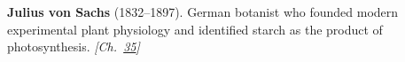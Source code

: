 \textbf{Julius von Sachs} (1832–1897). German botanist who founded modern experimental plant physiology and identified starch as the product of photosynthesis. \emph{[Ch.~\hyperref[ch:treesfromair]{35}]}

